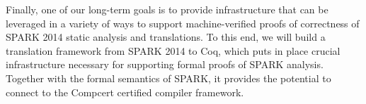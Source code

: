 Finally, one of our long-term goals is to provide infrastructure that can be 
leveraged in a variety of ways to support machine-verified proofs of 
correctness of SPARK 2014 static analysis and 
translations. To this end, we will build a translation framework 
from SPARK 2014 to Coq, which puts in place crucial infrastructure 
necessary for supporting formal proofs of SPARK analysis. Together 
with the formal semantics of SPARK, it provides the potential to 
connect to the Compcert \cite{Leroy:09} certified compiler framework.